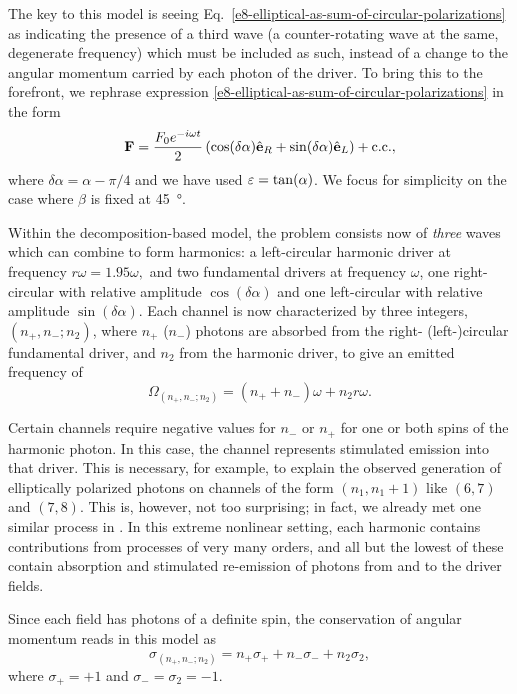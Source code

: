 The key to this model is seeing Eq.~\eqref{e8-elliptical-as-sum-of-circular-polarizations} as indicating the presence of a third wave (a counter-rotating wave at the same, degenerate frequency) which must be included as such, instead of a change to the angular momentum carried by each photon of the driver. To bring this to the forefront, we rephrase expression \eqref{e8-elliptical-as-sum-of-circular-polarizations} in the form
\begin{equation}
 \vb{F}=
 \frac{F_0e^{-i\omega t}}{2}
 \left(
 \cos(\delta\alpha)\hat{\vb{e}}_R
 +
  \sin(\delta\alpha)\hat{\vb{e}}_L
 \right)
 +\mathrm{c.c.},
 \label{e8-elliptical-as-two-fields}
\end{equation}
where $\delta\alpha=\alpha-\pi/4$ and we have used $\varepsilon=\tan(\alpha)$. We focus for simplicity on the case where $\beta$ is fixed at \SI{45}{\degree}.


Within the decomposition-based model, the problem consists now of \textit{three} waves which can combine to form harmonics: a left-circular harmonic driver at frequency $r\omega=1.95\omega,$ and two fundamental drivers at frequency $\omega$, one right-circular with relative amplitude $\cos(\delta\alpha)$ and one left-circular with relative amplitude $\sin(\delta\alpha)$. Each channel is now characterized by three integers, $(n_+,n_-;n_2)$, where $n_+$ ($n_-$) photons are absorbed from the right- (left-)circular fundamental driver, and $n_2$ from the harmonic driver, to give an emitted frequency of
\begin{equation}
 \Omega_{(n_+,n_-;n_2)}=(n_+ + n_-)\omega+n_2r\omega.
 \label{e8-model-2-energy-conservation}
\end{equation}


Certain channels require negative values for $n_-$ or $n_+$ for one or both spins of the harmonic photon. In this case, the channel represents stimulated emission into that driver. This is necessary, for example, to explain the observed generation of elliptically polarized photons on channels of the form $(n_1,n_1+1)$ like $(6,7)$ and $(7,8)$. This is, however, not too surprising; in fact, we already met one similar process in . In this extreme nonlinear setting, each harmonic contains contributions from processes of very many orders, and all but the lowest of these contain absorption and stimulated re-emission of photons from and to the driver fields.

Since each field has photons of a definite spin, the conservation of angular momentum reads in this model as
\begin{equation}
 \sigma_{(n_+,n_-;n_2)}=n_+\sigma_+ + n_-\sigma_- + n_2\sigma_2,
 \label{e8-model-2-angular-momentum-conservation}
\end{equation}
where $\sigma_+=+1$ and $\sigma_-=\sigma_2=-1$.


